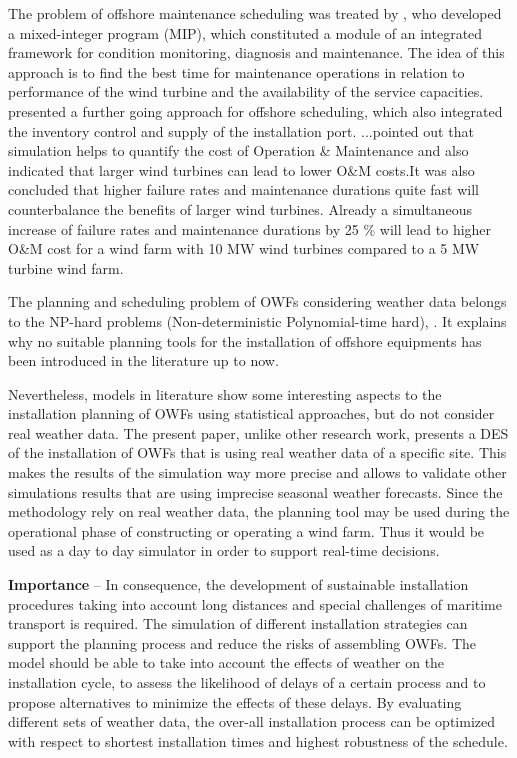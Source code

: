 The problem of offshore maintenance scheduling was treated by \cite{Kovacs2011497}, who developed a mixed-integer program (MIP), which constituted a module of an integrated framework for condition monitoring, diagnosis and maintenance. The idea of this approach is to find the best time for maintenance operations in relation to performance of the wind turbine and the availability of
the service capacities.
\cite{ISOPE2012} presented a further going approach for offshore scheduling, which also integrated the inventory control and supply 
of the installation port.
\cite{Hofmann2014} ...pointed out that simulation helps to quantify the cost of Operation \& Maintenance  and also indicated that 
larger wind turbines can lead to lower O\&M costs.It was also concluded that higher failure rates and maintenance durations quite 
fast will counterbalance the benefits of larger wind turbines. Already a simultaneous increase of failure rates and maintenance 
durations by 25 \% will lead to higher O\&M cost for a wind farm with 10 MW wind turbines compared to a 5 MW turbine wind farm. 


The planning and scheduling problem of OWFs considering weather data belongs to the NP-hard problems (Non-deterministic Polynomial-time hard), \cite{leeuwen1990}. It explains why no suitable planning tools for the installation of offshore equipments has been introduced in the literature up to now. 

Nevertheless, models in literature show some interesting aspects to the installation planning of OWFs using statistical approaches, but do not consider real weather data. The present paper, unlike other research work, presents a DES of the installation of OWFs that is using real weather data of a specific site. This makes the results of the simulation way more precise and allows to validate other simulations results that are using imprecise seasonal weather forecasts. Since the methodology rely on real weather data, the planning tool may be used during the operational phase of constructing or operating a wind farm. Thus it would be used as a day to day simulator in order to support real-time decisions.

\textbf{Importance} --
In consequence, the development of sustainable installation procedures taking into account long distances and special challenges of maritime transport is required. The simulation of different installation strategies can support the planning process and reduce the risks of assembling OWFs. The model should be able to take into account the effects of weather on the installation cycle, to assess the likelihood of delays of a certain process and to propose alternatives to minimize the effects of these delays. By evaluating different sets of weather data, the over-all installation process can be optimized with respect to shortest installation times and highest robustness of the schedule.

